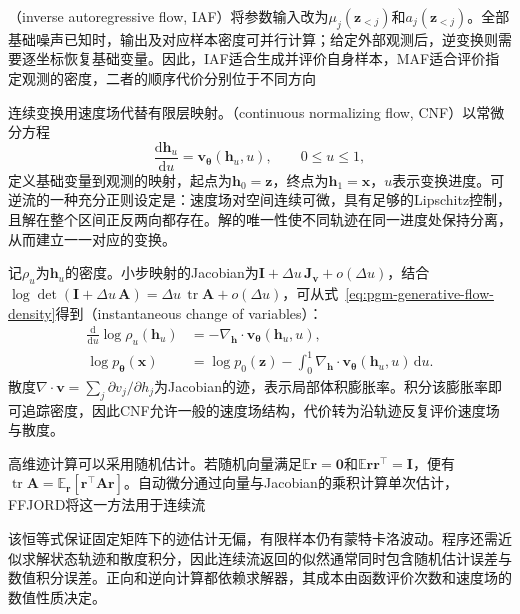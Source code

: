 （inverse autoregressive flow, IAF）将参数输入改为$\mu_j(\bm{z}_{<j})$和$a_j(\bm{z}_{<j})$。全部基础噪声已知时，输出及对应样本密度可并行计算；给定外部观测后，逆变换则需要逐坐标恢复基础变量。因此，IAF适合生成并评价自身样本，MAF适合评价指定观测的密度，二者的顺序代价分别位于不同方向

连续变换用速度场代替有限层映射。（continuous normalizing flow, CNF）以常微分方程
\[
  \frac{\mathrm{d}\bm{h}_u}{\mathrm{d}u}
    =\bm{v}_{\bm{\theta}}(\bm{h}_u,u),
  \qquad 0\leq u\leq1,
\]
定义基础变量到观测的映射，起点为$\bm{h}_0=\bm{z}$，终点为$\bm{h}_1=\bm{x}$，$u$表示变换进度。可逆流的一种充分正则设定是：速度场对空间连续可微，具有足够的Lipschitz控制，且解在整个区间正反两向都存在。解的唯一性使不同轨迹在同一进度处保持分离，从而建立一一对应的变换。

记$\rho_u$为$\bm{h}_u$的密度。小步映射的Jacobian为$\bm{I}+\Delta u\,\bm{J}_{\bm{v}}+o(\Delta u)$，结合$\log\det(\bm{I}+\Delta u\,\bm{A})=\Delta u\,\operatorname{tr}\bm{A}+o(\Delta u)$，可从式~\eqref{eq:pgm-generative-flow-density}得到（instantaneous change of variables）：
\begin{equation}
  \label{eq:pgm-generative-instantaneous-change}
  \begin{aligned}
    \frac{\mathrm{d}}{\mathrm{d}u}
         \log\rho_u(\bm{h}_u)
       &=-\nabla_{\bm{h}}\!\cdot
          \bm{v}_{\bm{\theta}}(\bm{h}_u,u),\\
    \log p_{\bm{\theta}}(\bm{x})
       &=\log p_0(\bm{z})
         -\int_0^1\nabla_{\bm{h}}\!\cdot
           \bm{v}_{\bm{\theta}}(\bm{h}_u,u)\,\mathrm{d}u.
  \end{aligned}
\end{equation}
散度$\nabla\cdot\bm{v}=\sum_j\partial v_j/\partial h_j$为Jacobian的迹，表示局部体积膨胀率。积分该膨胀率即可追踪密度，因此CNF允许一般的速度场结构，代价转为沿轨迹反复评价速度场与散度。

高维迹计算可以采用随机估计。若随机向量满足$\mathbb{E}\bm{r}=\bm{0}$和$\mathbb{E}\bm{r}\bm{r}^{\top}=\bm{I}$，便有$\operatorname{tr}\bm{A}=\mathbb{E}_{\bm{r}}[\bm{r}^{\top}\bm{A}\bm{r}]$。自动微分通过向量与Jacobian的乘积计算单次估计，FFJORD将这一方法用于连续流

该恒等式保证固定矩阵下的迹估计无偏，有限样本仍有蒙特卡洛波动。程序还需近似求解状态轨迹和散度积分，因此连续流返回的似然通常同时包含随机估计误差与数值积分误差。正向和逆向计算都依赖求解器，其成本由函数评价次数和速度场的数值性质决定。

